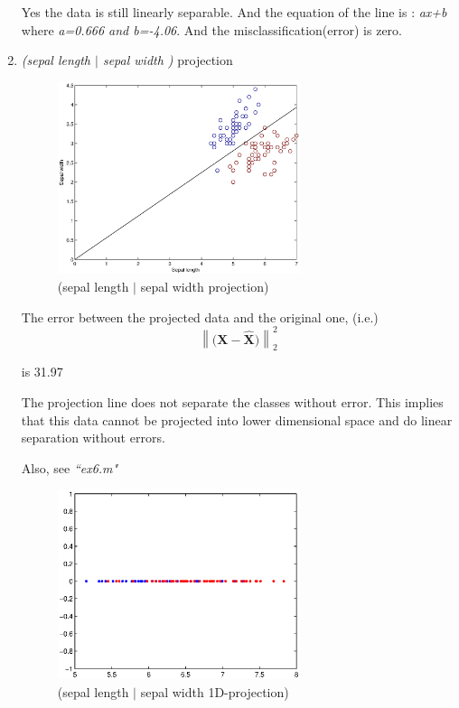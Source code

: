 \documentclass[a4paper]{article}
\newcommand\norm[1]{\left\lVert#1\right\rVert}
\begin{document}
\begin{enumerate}
Yes the data is still linearly separable. And the equation of the line is : \newline
\textit{ax+b} where \textit{a=0.666 and b=-4.06}. \newline
And the misclassification(error) is zero.


\item \textit{(sepal length $|$ sepal width ) } projection
\begin{figure}[H]
	\begin{center}
		\includegraphics[width=0.67\textwidth]{Ex6_2.eps}
		\caption{(sepal length $|$ sepal width projection)}\label{fig:seplenwid}		
	\end{center}
\end{figure}

The error between the projected data and the original one,  (i.e.)
\begin{equation*}
\norm{ \biggl(\mathbf{X - \hat{X}}\biggr) }^2_2
\end{equation*}

is 31.97 \newline

The projection line does not separate the classes without error. This implies that this data cannot be projected into lower dimensional space and do linear separation without errors. \newline

Also, see \textit{``ex6.m"}


\begin{figure}[H]
	\begin{center}
		\includegraphics[width=0.67\textwidth]{Ex6_3.eps}
		\caption{(sepal length $|$ sepal width 1D-projection)}\label{fig:seplenwidproj}		
	\end{center}
\end{figure}

\end{enumerate}
\end{document}
